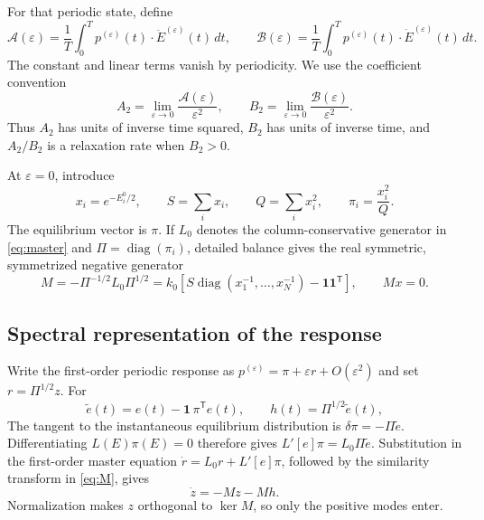 \documentclass[11pt]{article}
\newcommand{\one}{\bm{1}}
\newcommand{\diag}{\operatorname{diag}}
\begin{document}
For that periodic state, define
\begin{equation}
 \mathcal A(\varepsilon)=\frac1T\int_0^T
 p^{(\varepsilon)}(t)\mathbin{\cdot}\ddot E^{(\varepsilon)}(t)\,dt,
 \qquad
 \mathcal B(\varepsilon)=\frac1T\int_0^T
 p^{(\varepsilon)}(t)\mathbin{\cdot}\dot E^{(\varepsilon)}(t)\,dt. \label{eq:AB}
\end{equation}
The constant and linear terms vanish by periodicity.  We use the coefficient
convention
\begin{equation}
 A_2=\lim_{\varepsilon\to0}\frac{\mathcal A(\varepsilon)}{\varepsilon^2},
 \qquad
 B_2=\lim_{\varepsilon\to0}\frac{\mathcal B(\varepsilon)}{\varepsilon^2}. \label{eq:A2B2}
\end{equation}
Thus $A_2$ has units of inverse time squared, $B_2$ has units of inverse time,
and $A_2/B_2$ is a relaxation rate when $B_2>0$.

At $\varepsilon=0$, introduce
\begin{equation}
 x_i=e^{-E_i^0/2},\qquad S=\sum_i x_i,\qquad
 Q=\sum_i x_i^2,\qquad \pi_i=\frac{x_i^2}{Q}.               \label{eq:weights}
\end{equation}
The equilibrium vector is $\pi$.  If $L_0$ denotes the column-conservative
generator in \eqref{eq:master} and $\Pi=\diag(\pi_i)$, detailed balance gives the
real symmetric, symmetrized negative generator
\begin{equation}
 M=-\Pi^{-1/2}L_0\Pi^{1/2}
  =k_0\left[S\diag(x_1^{-1},\ldots,x_N^{-1})
              -\one\one^{\mathsf T}\right],
 \qquad Mx=0.                                                \label{eq:M}
\end{equation}

\subsection{Spectral representation of the response}

Write the first-order periodic response as
$p^{(\varepsilon)}=\pi+\varepsilon r+O(\varepsilon^2)$ and set
$r=\Pi^{1/2}z$.  For
\begin{equation}
 \widetilde e(t)=e(t)-\one\,\pi^{\mathsf T}e(t),
 \qquad h(t)=\Pi^{1/2}\widetilde e(t),                       \label{eq:centered}
\end{equation}
The tangent to the instantaneous equilibrium distribution is
$\delta\pi=-\Pi\widetilde e$.  Differentiating
$L(E)\pi(E)=0$ therefore gives
$L'[e]\pi=L_0\Pi\widetilde e$.  Substitution in the first-order master equation
$\dot r=L_0r+L'[e]\pi$, followed by the similarity transform in \eqref{eq:M}, gives
\begin{equation}
 \dot z=-Mz-Mh .                                             \label{eq:z}
\end{equation}
Normalization makes $z$ orthogonal to $\ker M$, so only the positive modes enter.
\end{document}
